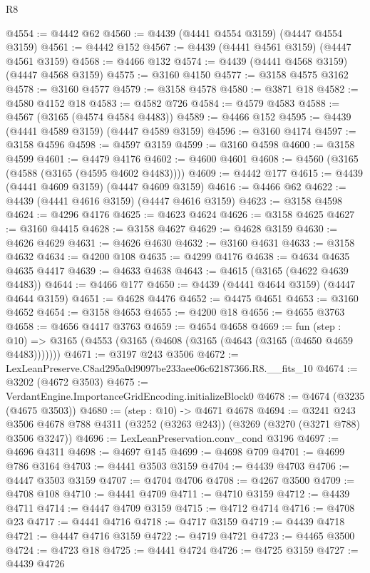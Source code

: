 \begin{lexlean}{R8}
\begin{coremodule}
@4554 := @4442 @62
@4560 := @4439 (@4441 @4554 @3159) (@4447 @4554 @3159)
@4561 := @4442 @152
@4567 := @4439 (@4441 @4561 @3159) (@4447 @4561 @3159)
@4568 := @4466 @132
@4574 := @4439 (@4441 @4568 @3159) (@4447 @4568 @3159)
@4575 := @3160 @4150
@4577 := @3158 @4575 @3162
@4578 := @3160 @4577
@4579 := @3158 @4578
@4580 := @3871 @18
@4582 := @4580 @4152 @18
@4583 := @4582 @726
@4584 := @4579 @4583
@4588 := @4567 (@3165 (@4574 @4584 @4483))
@4589 := @4466 @152
@4595 := @4439 (@4441 @4589 @3159) (@4447 @4589 @3159)
@4596 := @3160 @4174
@4597 := @3158 @4596
@4598 := @4597 @3159
@4599 := @3160 @4598
@4600 := @3158 @4599
@4601 := @4479 @4176
@4602 := @4600 @4601
@4608 := @4560 (@3165 (@4588 (@3165 (@4595 @4602 @4483))))
@4609 := @4442 @177
@4615 := @4439 (@4441 @4609 @3159) (@4447 @4609 @3159)
@4616 := @4466 @62
@4622 := @4439 (@4441 @4616 @3159) (@4447 @4616 @3159)
@4623 := @3158 @4598
@4624 := @4296 @4176
@4625 := @4623 @4624
@4626 := @3158 @4625
@4627 := @3160 @4415
@4628 := @3158 @4627
@4629 := @4628 @3159
@4630 := @4626 @4629
@4631 := @4626 @4630
@4632 := @3160 @4631
@4633 := @3158 @4632
@4634 := @4200 @108
@4635 := @4299 @4176
@4638 := @4634 @4635 @4635 @4417
@4639 := @4633 @4638
@4643 := @4615 (@3165 (@4622 @4639 @4483))
@4644 := @4466 @177
@4650 := @4439 (@4441 @4644 @3159) (@4447 @4644 @3159)
@4651 := @4628 @4476
@4652 := @4475 @4651
@4653 := @3160 @4652
@4654 := @3158 @4653
@4655 := @4200 @18
@4656 := @4655 @3763
@4658 := @4656 @4417 @3763
@4659 := @4654 @4658
@4669 := fun (step : @10) =>
  @3165 (@4553 (@3165 (@4608 (@3165 (@4643 (@3165 (@4650 @4659 @4483)))))))
@4671 := @3197 @243 @3506
@4672 := LexLeanPreserve.C8ad295a0d9097be233aee06c62187366.R8.__fits_10
@4674 := @3202 (@4672 @3503)
@4675 := VerdantEngine.ImportanceGridEncoding.initializeBlock0
@4678 := @4674 (@3235 (@4675 @3503))
@4680 := (step : @10) -> @4671 @4678
@4694 := @3241
    @243
    @3506
    @4678
    @788
    @4311
    (@3252 (@3263 @243))
    (@3269 (@3270 (@3271 @788) @3506 @3247))
@4696 := LexLeanPreservation.conv_cond @3196
@4697 := @4696 @4311
@4698 := @4697 @145
@4699 := @4698 @709
@4701 := @4699 @786 @3164
@4703 := @4441 @3503 @3159
@4704 := @4439 @4703
@4706 := @4447 @3503 @3159
@4707 := @4704 @4706
@4708 := @4267 @3500
@4709 := @4708 @108
@4710 := @4441 @4709
@4711 := @4710 @3159
@4712 := @4439 @4711
@4714 := @4447 @4709 @3159
@4715 := @4712 @4714
@4716 := @4708 @23
@4717 := @4441 @4716
@4718 := @4717 @3159
@4719 := @4439 @4718
@4721 := @4447 @4716 @3159
@4722 := @4719 @4721
@4723 := @4465 @3500
@4724 := @4723 @18
@4725 := @4441 @4724
@4726 := @4725 @3159
@4727 := @4439 @4726

\end{coremodule}
\end{lexlean}
